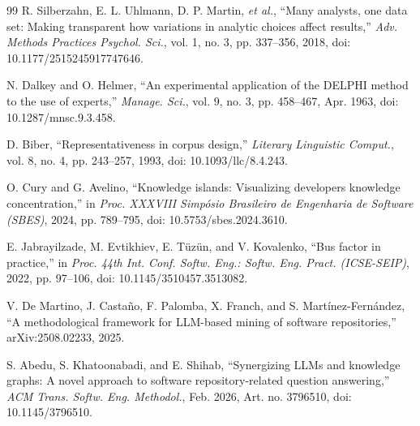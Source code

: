 \documentclass[conference]{IEEEtran}
\begin{document}
\begin{thebibliography}{99}
 R. Silberzahn, E. L. Uhlmann, D. P. Martin, \emph{et al.}, ``Many analysts, one data set: Making transparent how variations in analytic choices affect results,'' \emph{Adv. Methods Practices Psychol. Sci.}, vol. 1, no. 3, pp. 337--356, 2018, doi: 10.1177/2515245917747646.

 N. Dalkey and O. Helmer, ``An experimental application of the DELPHI method to the use of experts,'' \emph{Manage. Sci.}, vol. 9, no. 3, pp. 458--467, Apr. 1963, doi: 10.1287/mnsc.9.3.458.

 D. Biber, ``Representativeness in corpus design,'' \emph{Literary Linguistic Comput.}, vol. 8, no. 4, pp. 243--257, 1993, doi: 10.1093/llc/8.4.243.

 O. Cury and G. Avelino, ``Knowledge islands: Visualizing developers knowledge concentration,'' in \emph{Proc. XXXVIII Simp\'{o}sio Brasileiro de Engenharia de Software (SBES)}, 2024, pp. 789--795, doi: 10.5753/sbes.2024.3610.

 E. Jabrayilzade, M. Evtikhiev, E. T\"{u}z\"{u}n, and V. Kovalenko, ``Bus factor in practice,'' in \emph{Proc. 44th Int. Conf. Softw. Eng.: Softw. Eng. Pract. (ICSE-SEIP)}, 2022, pp. 97--106, doi: 10.1145/3510457.3513082.

 V. De Martino, J. Casta\~{n}o, F. Palomba, X. Franch, and S. Mart\'{i}nez-Fern\'{a}ndez, ``A methodological framework for LLM-based mining of software repositories,'' arXiv:2508.02233, 2025.

 S. Abedu, S. Khatoonabadi, and E. Shihab, ``Synergizing LLMs and knowledge graphs: A novel approach to software repository-related question answering,'' \emph{ACM Trans. Softw. Eng. Methodol.}, Feb. 2026, Art. no. 3796510, doi: 10.1145/3796510.

\end{thebibliography}
\end{document}
